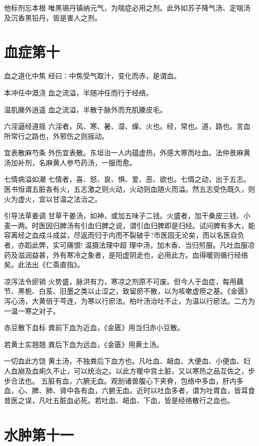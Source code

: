 \documentclass[a4paper,12pt,UTF8,twoside]{ctexbook}
\begin{document}
    他标剂忘本根
    唯黑锡丹镇纳元气，为喘症必用之剂。此外如苏子降气汤、定喘汤及沉香黑铅丹，皆是害人之剂。
    
    \chapter{血症第十}
    血之道化中焦
    经曰∶中焦受气取汁，变化而赤，是谓血。
    
    本冲任中溉浇
    血之流溢，半随冲任而行于经络。
    
    温肌腠外逍遥
    血之流溢，半散于脉外而充肌腠皮毛。
    
    六淫逼经道摇
    六淫者，风、寒、暑、湿、燥、火也。经，常也。道，路也。言血所常行之路也，外邪伤之则摇动。
    
    宜表散麻芍条
    外伤宜表散。东垣治一人内蕴虚热，外感大寒而吐血。法仲景麻黄汤加补剂，名麻黄人参芍药汤，一服而愈。
    
    七情病溢如潮
    七情者，喜、怒、哀、惧、爱、恶、欲也。七情之动，出于五志。医书恒谓五脏各有火，五志激之则火动，火动则血随火而溢。然五志受伤既久，则火为虚火，宜以甘温之法治之。
    
    引导法草姜调
    甘草干姜汤，如神，或加五味子二钱。火盛者，加干桑皮三钱、小麦一两。时医因归脾汤有引血归脾之说，谓引血归脾即是归经。试问脾有多大，能容离经之血成斗成盆，尽返而归于内而不裂破乎?市医固无论矣，而以名医自负者，亦蹈此弊，实可痛恨!
    温摄法理中超
    理中汤，加木香、当归煎服。凡吐血服凉药及滋润益甚，外有寒冷之象者，是阳虚阴走也，必用此方。血得暖则循行经络矣。此法出《仁斋直指》。
    
    凉泻法令瘀销
    火势盛，脉洪有力，寒凉之剂原不可废。但今人于血症，每用藕节、黑栀、白芨、旧墨之类以止涩之，致留瘀不散，以为咳嗽虚痨之基。《金匮》泻心汤，大黄倍于芩连，为寒以行瘀法。柏叶汤治吐不止，为温以行瘀法。二方为一温一寒之对子。
    
    赤豆散下血标
    粪前下血为近血，《金匮》用当归赤小豆散。
    
    若黄土实翘翘
    粪后下血为远血，《金匮》用黄土汤。
    
    一切血此方饶
    黄土汤，不独粪后下血方也。凡吐血、衄血、大便血、小便血、妇人血崩及血痢久不止，可以统治之。以此方暖中宫土脏，又以寒热之品互佐之，步步合法也。
    五脏有血，六腑无血。观剖诸兽腹心下夹脊，包络中多血，肝内多血，心、脾、肺、肾中各有血，六腑无血。近时以吐血多者，谓为吐胃血，皆耳食昔医之误，凡吐五脏血必死。若吐血、衄血、下血，皆是经络散行之血也。
    
    \chapter{水肿第十一}
    
\end{document}
